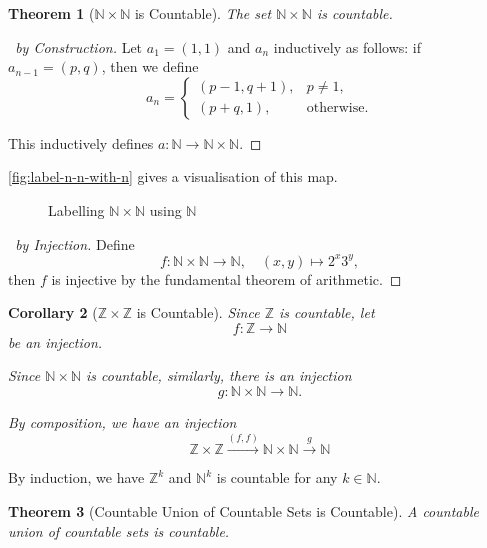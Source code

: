 \documentclass{article}
\newtheorem{theorem}{Theorem}[section]
\newtheorem{corollary}[theorem]{Corollary}
\theoremstyle{definition}
\theoremstyle{remark}
\newcommand{\pqty}[1]{\left(#1\right)}
\newcommand{\functiondomain}[3]{#1:#2\to #3}
\newcommand{\function}[5]{#1:#2\to #3,\quad #4\mapsto #5}
\newcommand{\NN}{\mathbb{N}}
\newcommand{\ZZ}{\mathbb{Z}}
\begin{document}
\begin{theorem}[\(\NN \times \NN\) is Countable]
    The set \(\NN \times \NN\) is countable.
\end{theorem}

\begin{proof}[\proofname\ by Construction]
    Let \(a_1 = \pqty{1, 1}\) and \(a_n\) inductively as follows: if \(a_{n - 1} = \pqty{p, q}\), then we define
    \[
        a_n = \begin{cases}
            \pqty{p - 1, q + 1}, & p \neq 1, \\
            \pqty{p + q, 1}, & \text{otherwise}.
        \end{cases}
    \]

    This inductively defines \(a: \NN \to \NN \times \NN\).
\end{proof}

\autoref{fig:label-n-n-with-n} gives a visualisation of this map.

\begin{figure}[ht!]
    \centering
    \caption{Labelling \(\NN \times \NN\) using \(\NN\)}
    \label{fig:label-n-n-with-n}
\end{figure}

\begin{proof}[\proofname\ by Injection]
    Define
    \[
        \function{f}{\NN \times \NN}{\NN}{\pqty{x, y}}{2^x 3^y,}
    \]
    then \(f\) is injective by the fundamental theorem of arithmetic.
\end{proof}

\begin{corollary}[\(\ZZ \times \ZZ\) is Countable]
    Since \(\ZZ\) is countable, let
    \[
        \functiondomain{f}{\ZZ}{\NN}
    \]
    be an injection.

    Since \(\NN \times \NN\) is countable, similarly, there is an injection
    \[
        \functiondomain{g}{\NN \times \NN}{\NN}.
    \]
    
    By composition, we have an injection
    \[
        \ZZ \times \ZZ \xrightarrow{\pqty{f, f}} \NN \times \NN \xrightarrow{g} \NN
    \]
\end{corollary}

By induction, we have \(\ZZ^k\) and \(\NN^k\) is countable for any \(k \in \NN\).

\begin{theorem}[Countable Union of Countable Sets is Countable]
    A countable union of countable sets is countable.
\end{theorem}
\end{document}
